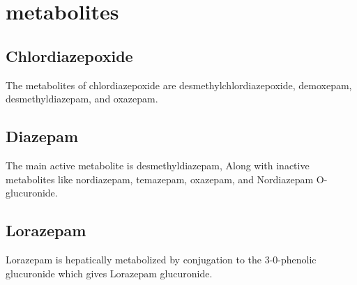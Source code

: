 \chapter{metabolites}

\section{Chlordiazepoxide}
\label{sec:met:chlor}
The metabolites of chlordiazepoxide are desmethylchlordiazepoxide, demoxepam, desmethyldiazepam, and oxazepam.


\section{Diazepam}
 	The main active metabolite is desmethyldiazepam, Along with inactive metabolites like nordiazepam, temazepam, oxazepam, and Nordiazepam O-glucuronide.


\section{Lorazepam} 
Lorazepam is hepatically metabolized by conjugation to the 3-0-phenolic glucuronide which gives Lorazepam glucuronide.

